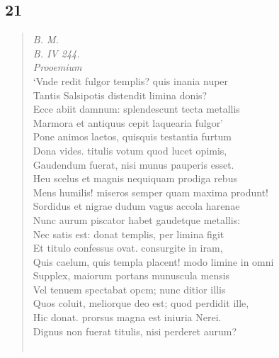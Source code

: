 \documentclass[11pt, a4paper]{report}
\begin{document}
            \subsection*{21}
      \begin{verse}
      \textit{B. M.} \\ \textit{B. IV 244.} \\ \textit{ \lbrack Prooemium \rbrack } \\ ‘Vnde redit fulgor templis? quis inania nuper \\ Tantis Salsipotis distendit limina donis? \\ Ecce abiit damnum: splendescunt tecta metallis \\ Marmora et antiquus cepit laquearia fulgor’ \\ Pone animos laetos, quisquis testantia furtum \\ Dona vides. titulis votum quod lucet opimis, \\ Gaudendum fuerat, nisi munus pauperis esset. \\ Heu scelus et magnis nequiquam prodiga rebus \\ Mens humilis! miseros semper quam maxima produnt! \\ Sordidus et nigrae dudum vagus accola harenae \\ Nunc aurum piscator habet gaudetque metallis: \\ Nec satis est: donat templis, per limina figit \\ Et titulo confessus ovat. consurgite in iram, \\ Quis caelum, quis templa placent! modo limine in omni \\ Supplex, maiorum portans munuscula mensis \\ Vel tenuem spectabat opcm; nunc ditior illis \\ Quos coluit, meliorque deo est; quod perdidit ille, \\ Hic donat. prorsus magna est iniuria Nerei. \\ Dignus non fuerat titulis, nisi perderet aurum? \\ 
        ﻿\pagebreak 

\end{verse}
\end{document}
